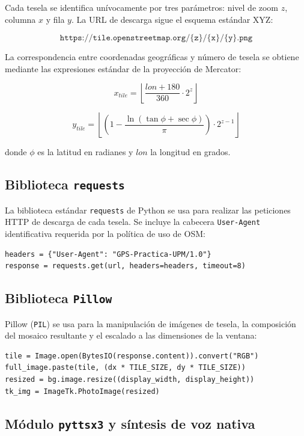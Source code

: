 \documentclass[10pt]{article}
\begin{document}
Cada tesela se identifica unívocamente por tres parámetros: nivel de zoom $z$, columna $x$ y fila $y$. La URL de descarga sigue el esquema estándar XYZ:

\[
\texttt{https://tile.openstreetmap.org/\{z\}/\{x\}/\{y\}.png}
\]

La correspondencia entre coordenadas geográficas y número de tesela se obtiene mediante las expresiones estándar de la proyección de Mercator:

\[
x_{tile} = \left\lfloor \frac{lon + 180}{360} \cdot 2^z \right\rfloor
\]

\[
y_{tile} = \left\lfloor \left(1 - \frac{\ln\!\left(\tan\phi + \sec\phi\right)}{\pi}\right) \cdot 2^{z-1} \right\rfloor
\]

donde $\phi$ es la latitud en radianes y $lon$ la longitud en grados.

\subsection{Biblioteca \texttt{requests}}

La biblioteca estándar \texttt{requests} de Python se usa para realizar las peticiones HTTP de descarga de cada tesela. Se incluye la cabecera \texttt{User-Agent} identificativa requerida por la política de uso de OSM:

\begin{lstlisting}[style=pythonEstilo]
headers = {"User-Agent": "GPS-Practica-UPM/1.0"}
response = requests.get(url, headers=headers, timeout=8)
\end{lstlisting}

\subsection{Biblioteca \texttt{Pillow}}

Pillow (\texttt{PIL}) se usa para la manipulación de imágenes de tesela, la composición del mosaico resultante y el escalado a las dimensiones de la ventana:

\begin{lstlisting}[style=pythonEstilo]
tile = Image.open(BytesIO(response.content)).convert("RGB")
full_image.paste(tile, (dx * TILE_SIZE, dy * TILE_SIZE))
resized = bg.image.resize((display_width, display_height))
tk_img = ImageTk.PhotoImage(resized)
\end{lstlisting}

\subsection{Módulo \texttt{pyttsx3} y síntesis de voz nativa}
\end{document}
